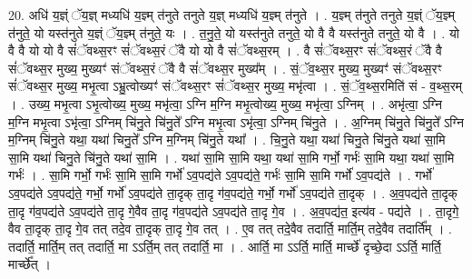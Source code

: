 \documentclass[17pt]{extarticle}
\begin{document}
20. अधि॑ य॒ज्ञ्ं ॅय॒ज्ञ् मध्यधि॑ य॒ज्ञ्म् त॑नुते तनुते य॒ज्ञ् मध्यधि॑ य॒ज्ञ्म् त॑नुते । . य॒ज्ञ्म् त॑नुते तनुते य॒ज्ञ्ं ॅय॒ज्ञ्म् त॑नुते॒ यो यस्त॑नुते य॒ज्ञ्ं ॅय॒ज्ञ्म् त॑नुते॒ यः । . त॒नु॒ते॒ यो यस्त॑नुते तनुते॒ यो वै वै यस्त॑नुते तनुते॒ यो वै । . यो वै वै यो यो वै सं॑ॅवथ्स॒रꣳ सं॑ॅवथ्स॒रं ॅवै यो यो वै सं॑ॅवथ्स॒रम् । . वै सं॑ॅवथ्स॒रꣳ सं॑ॅवथ्स॒रं ॅवै वै सं॑ॅवथ्स॒र मुख्य॒ मुख्यꣳ॑ संॅवथ्स॒रं ॅवै वै सं॑ॅवथ्स॒र मुख्य᳚म् । . सं॒ॅव॒थ्स॒र मुख्य॒ मुख्यꣳ॑ संॅवथ्स॒रꣳ सं॑ॅवथ्स॒र मुख्य॒ मभृ॒त्वा ऽभ्रु॒त्वोख्यꣳ॑ संॅवथ्स॒रꣳ सं॑ॅवथ्स॒र मुख्य॒ मभृ॑त्वा । . सं॒ॅव॒थ्स॒रमिति॑ सं - व॒थ्स॒रम् । . उख्य॒ मभृ॒त्वा ऽभृ॒त्वोख्य॒ मुख्य॒ मभृ॑त्वा॒ ऽग्नि म॒ग्नि मभृ॒त्वोख्य॒ मुख्य॒ मभृ॑त्वा॒ ऽग्निम् । . अभृ॑त्वा॒ ऽग्नि म॒ग्नि मभृ॒त्वा ऽभृ॑त्वा॒ ऽग्निम् चि॑नु॒ते चि॑नु॒ते᳚ ऽग्नि मभृ॒त्वा ऽभृ॑त्वा॒ ऽग्निम् चि॑नु॒ते । . अ॒ग्निम् चि॑नु॒ते चि॑नु॒ते᳚ ऽग्नि म॒ग्निम् चि॑नु॒ते यथा॒ यथा॑ चिनु॒ते᳚ ऽग्नि म॒ग्निम् चि॑नु॒ते यथा᳚ । . चि॒नु॒ते यथा॒ यथा॑ चिनु॒ते चि॑नु॒ते यथा॑ सा॒मि सा॒मि यथा॑ चिनु॒ते चि॑नु॒ते यथा॑ सा॒मि । . यथा॑ सा॒मि सा॒मि यथा॒ यथा॑ सा॒मि गर्भो॒ गर्भः॑ सा॒मि यथा॒ यथा॑ सा॒मि गर्भः॑ । . सा॒मि गर्भो॒ गर्भः॑ सा॒मि सा॒मि गर्भो॑ ऽव॒पद्य॑ते ऽव॒पद्य॑ते॒ गर्भः॑ सा॒मि सा॒मि गर्भो॑ ऽव॒पद्य॑ते । . गर्भो॑ ऽव॒पद्य॑ते ऽव॒पद्य॑ते॒ गर्भो॒ गर्भो॑ ऽव॒पद्य॑ते ता॒दृक् ता॒दृ ग॑व॒पद्य॑ते॒ गर्भो॒ गर्भो॑ ऽव॒पद्य॑ते ता॒दृक् । . अ॒व॒पद्य॑ते ता॒दृक् ता॒दृ ग॑व॒पद्य॑ते ऽव॒पद्य॑ते ता॒दृ गे॒वैव ता॒दृ ग॑व॒पद्य॑ते ऽव॒पद्य॑ते ता॒दृ गे॒व । . अ॒व॒पद्य॑त॒ इत्य॑व - पद्य॑ते । . ता॒दृगे॒ वैव ता॒दृक् ता॒दृ गे॒व तत् तदे॒व ता॒दृक् ता॒दृ गे॒व तत् । . ए॒व तत् तदे॒वैव तदार्ति॒ मार्ति॒म् तदे॒वैव तदार्ति᳚म् । . तदार्ति॒ मार्ति॒म् तत् तदार्ति॒ मा ऽऽर्ति॒म् तत् तदार्ति॒ मा । . आर्ति॒ मा ऽऽर्ति॒ मार्ति॒ मार्च्छे॑ दृच्छे॒दा ऽऽर्ति॒ मार्ति॒ मार्च्छे᳚त् । \newline
\end{document}
